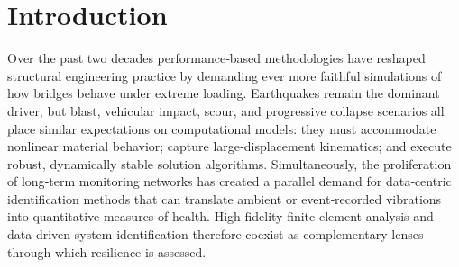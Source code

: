 \section{Introduction}




%
%
%




Over the past two decades performance‑based methodologies have reshaped
structural engineering practice by demanding ever more faithful
simulations of how bridges behave under extreme loading. Earthquakes
remain the dominant driver, but blast, vehicular impact, scour, and
progressive collapse scenarios all place similar expectations on
computational models: they must accommodate nonlinear material
behavior; capture large‑displacement kinematics; and execute robust,
dynamically stable solution algorithms. 
Simultaneously, the proliferation of long‑term monitoring networks has created a parallel
demand for data‑centric identification methods that can translate
ambient or event‑recorded vibrations into quantitative measures of
health. High‑fidelity finite‑element analysis and data‑driven system
identification therefore coexist as complementary lenses through which resilience is assessed.


